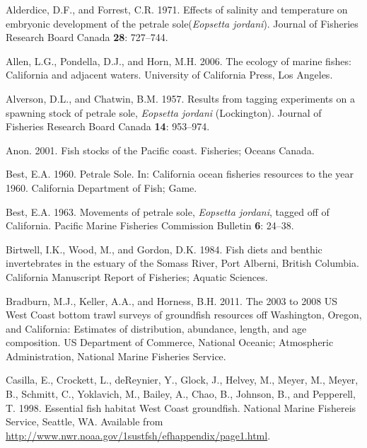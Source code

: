 \documentclass[11pt,
  english,
  letterpaper,
]{article}
\newlength{\cslhangindent}
\newenvironment{CSLReferences}[2] %
 {%
  \setlength{\parindent}{0pt}
  \ifodd #1 \everypar{\setlength{\hangindent}{\cslhangindent}}\ignorespaces\fi
  \ifnum #2 > 0
  \setlength{\parskip}{#2\baselineskip}
  \fi
 }%
 {}
\begin{document}
\hypertarget{refs}{}
\begin{CSLReferences}{1}{0}
\leavevmode{}%
Alderdice, D.F., and Forrest, C.R. 1971. Effects of salinity and temperature on embryonic development of the petrale sole(\emph{{Eopsetta} jordani}). Journal of Fisheries Research Board Canada \textbf{28}: 727--744.

\leavevmode{}%
Allen, L.G., Pondella, D.J., and Horn, M.H. 2006. The ecology of marine fishes: {California} and adjacent waters. University of California Press, Los Angeles.

\leavevmode{}%
Alverson, D.L., and Chatwin, B.M. 1957. Results from tagging experiments on a spawning stock of petrale sole, \emph{{Eopsetta} jordani} ({Lockington}). Journal of Fisheries Research Board Canada \textbf{14}: 953--974.

\leavevmode{}%
Anon. 2001. Fish stocks of the {Pacific} coast. Fisheries; Oceans Canada.

\leavevmode{}%
Best, E.A. 1960. Petrale {Sole}. {In}: {California} ocean fisheries resources to the year 1960. California Department of Fish; Game.

\leavevmode{}%
Best, E.A. 1963. Movements of petrale sole, \emph{{Eopsetta} jordani}, tagged off of {California}. Pacific Marine Fisheries Commission Bulletin \textbf{6}: 24--38.

\leavevmode{}%
Birtwell, I.K., Wood, M., and Gordon, D.K. 1984. Fish diets and benthic invertebrates in the estuary of the {Somass} {River}, {Port} {Alberni}, {British} {Columbia}. California Manuscript Report of Fisheries; Aquatic Sciences.

\leavevmode{}%
Bradburn, M.J., Keller, A.A., and Horness, B.H. 2011. The 2003 to 2008 {US} {West} {Coast} bottom trawl surveys of groundfish resources off {Washington}, {Oregon}, and {California}: Estimates of distribution, abundance, length, and age composition. US Department of Commerce, National Oceanic; Atmospheric Administration, National Marine Fisheries Service.

\leavevmode{}%
Casilla, E., Crockett, L., deReynier, Y., Glock, J., Helvey, M., Meyer, M., Meyer, B., Schmitt, C., Yoklavich, M., Bailey, A., Chao, B., Johnson, B., and Pepperell, T. 1998. Essential fish habitat {West} {Coast} groundfish. National Marine Fishereis Service, Seattle, WA. Available from \url{http://www.nwr.noaa.gov/1sustfsh/efhappendix/page1.html}.


\end{CSLReferences}
\end{document}
